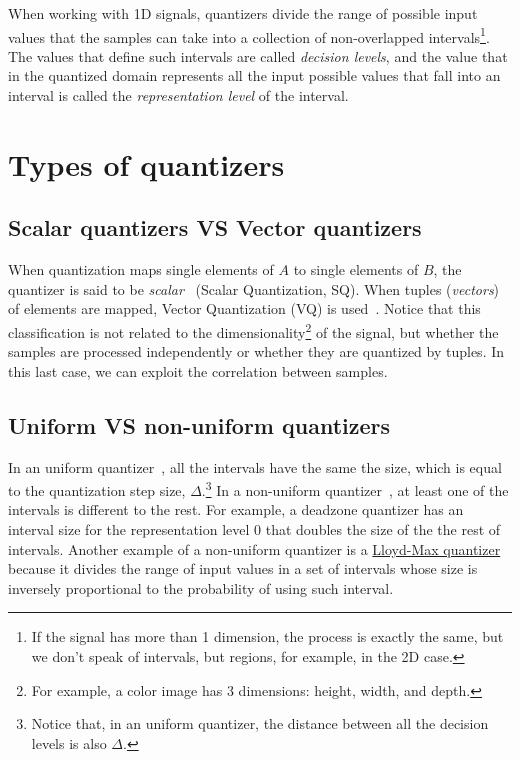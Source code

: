 When working with 1D signals, quantizers divide the range of possible
input values that the samples can take into a collection of
non-overlapped intervals\footnote{If the signal has more than 1
  dimension, the process is exactly the same, but we don't speak of
  intervals, but regions, for example, in the 2D case.}. The values
that define such intervals are called \emph{decision levels}, and the
value that in the quantized domain represents all the input possible
values that fall into an interval is called the \emph{representation
  level} of the interval.


\section{Types of quantizers}

\subsection{Scalar quantizers VS Vector quantizers}

When quantization maps single elements of $A$ to single elements of
$B$, the quantizer is said to be
\emph{scalar}~\cite{vruiz__scalar_quantization} (Scalar Quantization,
SQ). When tuples (\emph{vectors}) of elements are mapped, Vector
Quantization (VQ) is used~\cite{vruiz__vector_quantization}. Notice
that this classification is not related to the
dimensionality\footnote{For example, a color image has 3 dimensions:
  height, width, and depth.}  of the signal, but whether the samples
are processed independently or whether they are quantized by
tuples. In this last case, we can exploit the correlation between
samples.


\subsection{Uniform VS non-uniform quantizers}

In an uniform quantizer~\cite{vruiz__scalar_quantization}, all the
intervals have the same the size, which is equal to the quantization
step size, $\Delta$.\footnote{Notice that, in an uniform quantizer,
  the distance between all the decision levels is also $\Delta$.} In a
non-uniform quantizer~\cite{vruiz__scalar_quantization}, at least one
of the intervals is different to the rest. For example, a deadzone
quantizer \cite{vruiz__scalar_quantization} has an interval size for
the representation level 0 that doubles the size of the the rest of
intervals. Another example of a non-uniform quantizer is a
\href{https://en.wikipedia.org/wiki/Lloyd%27s_algorithm}{Lloyd-Max
  quantizer} \cite{vruiz__scalar_quantization} because it divides the
range of input values in a set of intervals whose size is inversely
proportional to the probability of using such interval.

